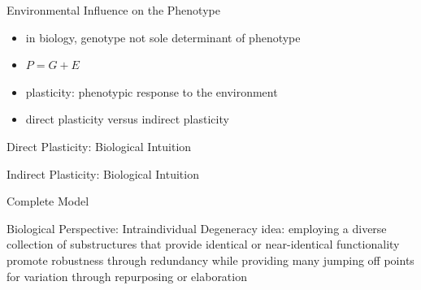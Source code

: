 \begin{frame}{Environmental Influence on the Phenotype}
\begin{itemize}
	\item in biology, genotype not sole determinant of phenotype
    \item $P = G + E$
    \item plasticity: phenotypic response to the environment
    \item direct plasticity versus indirect plasticity
\end{itemize}
\end{frame}

\begin{frame}{Direct Plasticity: Biological Intuition}
  
\end{frame}

\begin{frame}{Indirect Plasticity: Biological Intuition}
  
\end{frame}

\begin{frame}{Complete Model}

\end{frame}

\begin{frame}{Biological Perspective: Intraindividual Degeneracy}
  idea: employing a diverse collection of substructures that provide identical or near-identical functionality promote robustness through redundancy while providing many jumping off points for variation through repurposing or elaboration
  
\end{frame}


